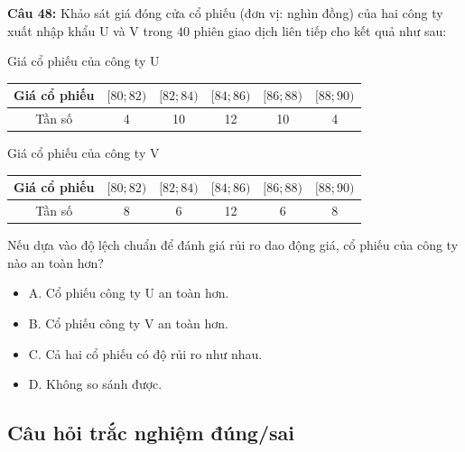 \documentclass[12pt]{article}
\begin{document}
	\vspace{4mm}
	
	\noindent \textbf{Câu 48:} Khảo sát giá đóng cửa cổ phiếu (đơn vị: nghìn đồng) của hai công ty xuất nhập khẩu U và V trong 40 phiên giao dịch liên tiếp cho kết quả như sau:
	\begin{center}
		Giá cổ phiếu của công ty U
		\renewcommand{\arraystretch}{1.3}
		\begin{tabular}{|c|c|c|c|c|c|}
			\hline
			Giá cổ phiếu & $[80; 82)$ & $[82; 84)$ & $[84; 86)$ & $[86; 88)$ & $[88; 90)$ \\
			\hline
			Tần số & 4 & 10 & 12 & 10 & 4 \\
			\hline
		\end{tabular}
	\end{center}
	\begin{center}
		Giá cổ phiếu của công ty V
		\renewcommand{\arraystretch}{1.3}
		\begin{tabular}{|c|c|c|c|c|c|}
			\hline
			Giá cổ phiếu & $[80; 82)$ & $[82; 84)$ & $[84; 86)$ & $[86; 88)$ & $[88; 90)$ \\
			\hline
			Tần số & 8 & 6 & 12 & 6 & 8 \\
			\hline
		\end{tabular}
	\end{center}
	Nếu dựa vào độ lệch chuẩn để đánh giá rủi ro dao động giá, cổ phiếu của công ty nào an toàn hơn?
	\begin{itemize}[label=, leftmargin=*]
		\item A. Cổ phiếu công ty U an toàn hơn.
		\item B. Cổ phiếu công ty V an toàn hơn.
		\item C. Cả hai cổ phiếu có độ rủi ro như nhau.
		\item D. Không so sánh được.
	\end{itemize}
	
	
	\subsection{Câu hỏi trắc nghiệm đúng/sai}
	
\end{document}
